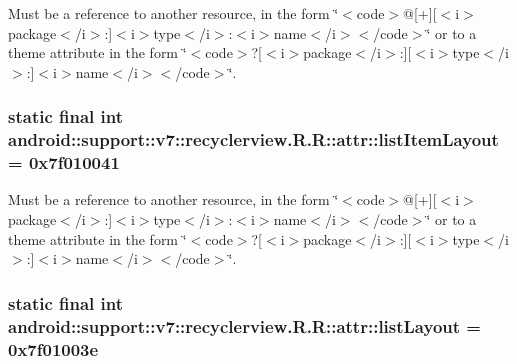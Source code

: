 Must be a reference to another resource, in the form \char`\"{}$<$code$>$@\mbox{[}+\mbox{]}\mbox{[}$<$i$>$package$<$/i$>$:\mbox{]}$<$i$>$type$<$/i$>$:$<$i$>$name$<$/i$>$$<$/code$>$\char`\"{} or to a theme attribute in the form \char`\"{}$<$code$>$?\mbox{[}$<$i$>$package$<$/i$>$:\mbox{]}\mbox{[}$<$i$>$type$<$/i$>$:\mbox{]}$<$i$>$name$<$/i$>$$<$/code$>$\char`\"{}. \hypertarget{classandroid_1_1support_1_1v7_1_1recyclerview_1_1_r_1_1attr_065405f5cac62be80c25ffd1425e1476}{
\subsubsection[{listItemLayout}]{\setlength{\rightskip}{0pt plus 5cm}static final int android::support::v7::recyclerview.R.R::attr::listItemLayout = 0x7f010041}}
\label{classandroid_1_1support_1_1v7_1_1recyclerview_1_1_r_1_1attr_065405f5cac62be80c25ffd1425e1476}


Must be a reference to another resource, in the form \char`\"{}$<$code$>$@\mbox{[}+\mbox{]}\mbox{[}$<$i$>$package$<$/i$>$:\mbox{]}$<$i$>$type$<$/i$>$:$<$i$>$name$<$/i$>$$<$/code$>$\char`\"{} or to a theme attribute in the form \char`\"{}$<$code$>$?\mbox{[}$<$i$>$package$<$/i$>$:\mbox{]}\mbox{[}$<$i$>$type$<$/i$>$:\mbox{]}$<$i$>$name$<$/i$>$$<$/code$>$\char`\"{}. \hypertarget{classandroid_1_1support_1_1v7_1_1recyclerview_1_1_r_1_1attr_ec88c0720886737eed6df11c4688e77e}{
\subsubsection[{listLayout}]{\setlength{\rightskip}{0pt plus 5cm}static final int android::support::v7::recyclerview.R.R::attr::listLayout = 0x7f01003e}}
\label{classandroid_1_1support_1_1v7_1_1recyclerview_1_1_r_1_1attr_ec88c0720886737eed6df11c4688e77e}


